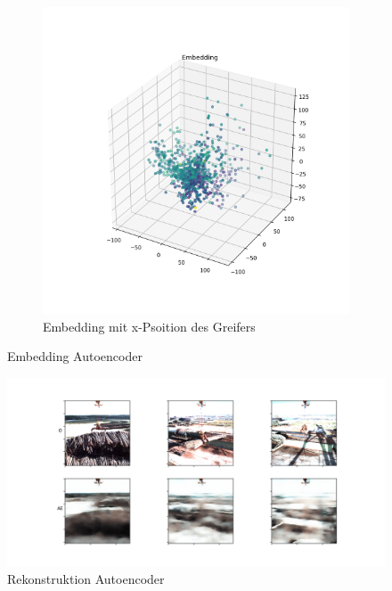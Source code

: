 \begin{figure}[h]
\begin{subfigure}[c]{0.49\textwidth}
			\includegraphics[width=1\textwidth, center]{bilder/Hauptteil/Autoencoder_Grappel_Detection/Embedding_x.png}
			\caption{Embedding mit x-Psoition des Greifers}
			\label{img:RecalllIoUt_RegressionAufAutoencoder}	
		\end{subfigure}
		\caption{Embedding Autoencoder}
		\label{img:EmbeddingAE}
	\end{figure}
	
	\begin{figure}[h]
		\centering
		\includegraphics[width=1\textwidth, center]{bilder/Hauptteil/Autoencoder_Grappel_Detection/OriginalPicturesAndReconstruction.png}
		\caption{Rekonstruktion Autoencoder}
		\label{img:Rekonstruktion AE}
	\end{figure}  
	
